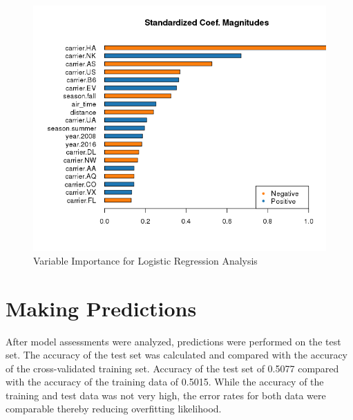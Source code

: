 \documentclass[12pt,twoside]{amherstthesis}
\begin{document}
  \begin{figure}[htbp]
  \centering
  \includegraphics[scale = 1,angle = 0]{figure/LogVarImp.png}
  \caption[Variable Importance for Logistic Regression Analysis]{\normalsize{Variable Importance for Logistic Regression Analysis}}
  \label{fig:Hyarn34}
  \end{figure}
  
  \clearpage
  
  \section{Making Predictions}\label{making-predictions}
  
  After model assessments were analyzed, predictions were performed on the
  test set. The accuracy of the test set was calculated and compared with
  the accuracy of the cross-validated training set. Accuracy of the test
  set of 0.5077 compared with the accuracy of the training data of 0.5015.
  While the accuracy of the training and test data was not very high, the
  error rates for both data were comparable thereby reducing overfitting
  likelihood.
  
  \begin{Shaded}
  \begin{Highlighting}[]
  \StringTok{ }\NormalTok{(}  
  \end{Highlighting}
  \end{Shaded}
  
\end{document}
